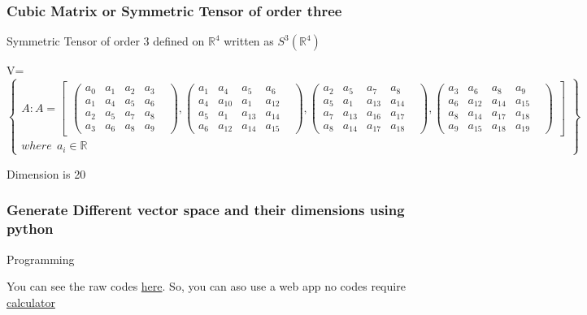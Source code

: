 \documentclass{beamer}
\newenvironment{changemargin}[2]{%
  \begin{list}{}{%
    \setlength{\topsep}{0pt}%
    \setlength{\leftmargin}{#1}%
    \setlength{\rightmargin}{#2}%
    \setlength{\listparindent}{\parindent}%
    \setlength{\itemindent}{\parindent}%
    \setlength{\parsep}{\parskip}%
  }%
  \item[]}{\end{list}}
\begin{document}
\begin{frame}
\frametitle{Cubic Matrix or Symmetric Tensor of order three} \begin{block}{}
\begin{itemize}
    \item Symmetric Tensor of order 3 defined on $\mathbb{R}^4$ written as $S^3(\mathbb{R}^4)$

\begin{changemargin}{-27pt}{0pt}
\newcommand\fontsizeX{\fontsize{4.3pt}{10pt}}
{\fontsizeX V=$\begin{Bmatrix} A: A=\begin{bmatrix}
  \begin{pmatrix}a_0&a_1&a_2&a_3&\\
  a_1&a_4&a_5&a_6&\\
  a_2&a_5&a_7&a_8&\\
  a_3&a_6&a_8&a_9&
\end{pmatrix},

 \begin{pmatrix}a_1&a_4&a_5&a_6&\\
  a_4&a_{10}&a_1&a_{12}&\\
  a_5&a_1&a_{13}&a_{14}&\\
  a_6&a_{12}&a_{14}&a_{15}&
\end{pmatrix},

 \begin{pmatrix}a_2&a_5&a_7&a_8&\\
  a_5&a_1&a_{13}&a_{14}&\\
  a_7&a_{13}&a_{16}&a_{17}&\\
  a_8&a_{14}&a_{17}&a_{18}&
\end{pmatrix},

 \begin{pmatrix}a_3&a_6&a_8&a_9&\\
  a_6&a_{12}&a_{14}&a_{15}&\\
  a_8&a_{14}&a_{17}&a_{18}&\\
  a_9&a_{15}&a_{18}&a_{19}&
\end{pmatrix}
\end{bmatrix}\\
where~~a_i \in \mathbb{R}
\end{Bmatrix}$}
\end{changemargin}
Dimension is 20
\end{itemize}
\end{block}
\end{frame}
\begin{frame}
\frametitle{Generate Different vector space and their dimensions using python}
\begin{block}{Programming} 

You can see the raw codes 
\href{https://raw.githubusercontent.com/maxwizardth/Algebra/main/new.py}{here}.
So, you can aso use a web app no codes require 
\href{https://maxwizardth.github.io/youngScientist/Pages/chisquare/Space.html}{calculator}
\end{block}
\end{frame}
\end{document}
